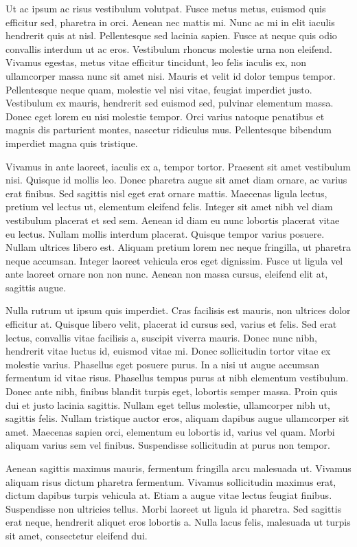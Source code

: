\documentclass[10pt]{article}
\begin{document}
	Ut ac ipsum ac risus vestibulum volutpat. Fusce metus metus, euismod quis efficitur sed, pharetra in orci. Aenean nec mattis mi. Nunc ac mi in elit iaculis hendrerit quis at nisl. Pellentesque sed lacinia sapien. Fusce at neque quis odio convallis interdum ut ac eros. Vestibulum rhoncus molestie urna non eleifend. Vivamus egestas, metus vitae efficitur tincidunt, leo felis iaculis ex, non ullamcorper massa nunc sit amet nisi. Mauris et velit id dolor tempus tempor. Pellentesque neque quam, molestie vel nisi vitae, feugiat imperdiet justo. Vestibulum ex mauris, hendrerit sed euismod sed, pulvinar elementum massa. Donec eget lorem eu nisi molestie tempor. Orci varius natoque penatibus et magnis dis parturient montes, nascetur ridiculus mus. Pellentesque bibendum imperdiet magna quis tristique.
	
	Vivamus in ante laoreet, iaculis ex a, tempor tortor. Praesent sit amet vestibulum nisi. Quisque id mollis leo. Donec pharetra augue sit amet diam ornare, ac varius erat finibus. Sed sagittis nisl eget erat ornare mattis. Maecenas ligula lectus, pretium vel lectus ut, elementum eleifend felis. Integer sit amet nibh vel diam vestibulum placerat et sed sem. Aenean id diam eu nunc lobortis placerat vitae eu lectus. Nullam mollis interdum placerat. Quisque tempor varius posuere. Nullam ultrices libero est. Aliquam pretium lorem nec neque fringilla, ut pharetra neque accumsan. Integer laoreet vehicula eros eget dignissim. Fusce ut ligula vel ante laoreet ornare non non nunc. Aenean non massa cursus, eleifend elit at, sagittis augue.
	
	Nulla rutrum ut ipsum quis imperdiet. Cras facilisis est mauris, non ultrices dolor efficitur at. Quisque libero velit, placerat id cursus sed, varius et felis. Sed erat lectus, convallis vitae facilisis a, suscipit viverra mauris. Donec nunc nibh, hendrerit vitae luctus id, euismod vitae mi. Donec sollicitudin tortor vitae ex molestie varius. Phasellus eget posuere purus. In a nisi ut augue accumsan fermentum id vitae risus. Phasellus tempus purus at nibh elementum vestibulum. Donec ante nibh, finibus blandit turpis eget, lobortis semper massa. Proin quis dui et justo lacinia sagittis. Nullam eget tellus molestie, ullamcorper nibh ut, sagittis felis. Nullam tristique auctor eros, aliquam dapibus augue ullamcorper sit amet. Maecenas sapien orci, elementum eu lobortis id, varius vel quam. Morbi aliquam varius sem vel finibus. Suspendisse sollicitudin at purus non tempor.
	
	Aenean sagittis maximus mauris, fermentum fringilla arcu malesuada ut. Vivamus aliquam risus dictum pharetra fermentum. Vivamus sollicitudin maximus erat, dictum dapibus turpis vehicula at. Etiam a augue vitae lectus feugiat finibus. Suspendisse non ultricies tellus. Morbi laoreet ut ligula id pharetra. Sed sagittis erat neque, hendrerit aliquet eros lobortis a. Nulla lacus felis, malesuada ut turpis sit amet, consectetur eleifend dui.
	
\end{document}
